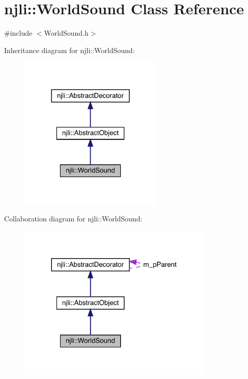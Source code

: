 \hypertarget{classnjli_1_1_world_sound}{}\section{njli\+:\+:World\+Sound Class Reference}
\label{classnjli_1_1_world_sound}


{\ttfamily \#include $<$World\+Sound.\+h$>$}



Inheritance diagram for njli\+:\+:World\+Sound\+:\nopagebreak
\begin{figure}[H]
\begin{center}
\leavevmode
\includegraphics[width=194pt]{classnjli_1_1_world_sound__inherit__graph}
\end{center}
\end{figure}


Collaboration diagram for njli\+:\+:World\+Sound\+:\nopagebreak
\begin{figure}[H]
\begin{center}
\leavevmode
\includegraphics[width=264pt]{classnjli_1_1_world_sound__coll__graph}
\end{center}
\end{figure}
